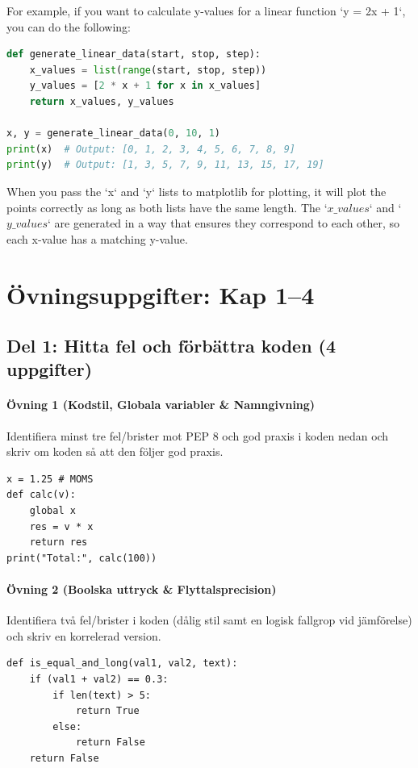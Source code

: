 \documentclass{article}
\begin{document}
\begin{enumerate}
For example, if you want to calculate y-values for a linear function `y = 2x + 1`, you can do the following:
\begin{lstlisting}[language=Python]
def generate_linear_data(start, stop, step):
    x_values = list(range(start, stop, step))
    y_values = [2 * x + 1 for x in x_values]
    return x_values, y_values

x, y = generate_linear_data(0, 10, 1)
print(x)  # Output: [0, 1, 2, 3, 4, 5, 6, 7, 8, 9]
print(y)  # Output: [1, 3, 5, 7, 9, 11, 13, 15, 17, 19]
\end{lstlisting} 

When you pass the `x` and `y` lists to matplotlib for plotting, it will plot the points correctly as long as both lists have the same length. The `$x\_values$` and `$y\_values$` are generated in a way that ensures they correspond to each other, so each x-value has a matching y-value. 
\end{enumerate}

\section*{Övningsuppgifter: Kap 1--4}

\subsection*{Del 1: Hitta fel och förbättra koden (4 uppgifter)}

\paragraph{Övning 1 (Kodstil, Globala variabler \& Namngivning)}
Identifiera minst tre fel/brister mot PEP 8 och god praxis i koden nedan och skriv om koden så att den följer god praxis.
\begin{lstlisting}
x = 1.25 # MOMS
def calc(v):
    global x
    res = v * x
    return res
print("Total:", calc(100))
\end{lstlisting}

\paragraph{Övning 2 (Boolska uttryck \& Flyttalsprecision)}
Identifiera två fel/brister i koden (dålig stil samt en logisk fallgrop vid jämförelse) och skriv en korrelerad version.
\begin{lstlisting}
def is_equal_and_long(val1, val2, text):
    if (val1 + val2) == 0.3:
        if len(text) > 5:
            return True
        else:
            return False
    return False
\end{lstlisting}
\end{document}
